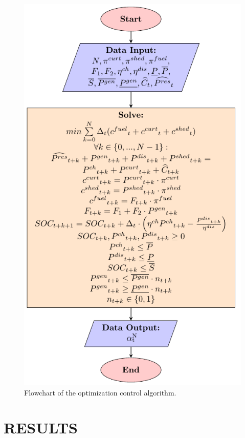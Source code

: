 \documentclass{ECOS_2019}
\begin{document}
\begin{figure}[h!]
    \centering
    \includegraphics[scale=0.8]{Figures/Optimization controller.pdf}
    \caption{Flowchart of the optimization control algorithm.}
    \label{fig_optimization_controller}
\end{figure}
\section{RESULTS}
\end{document}
